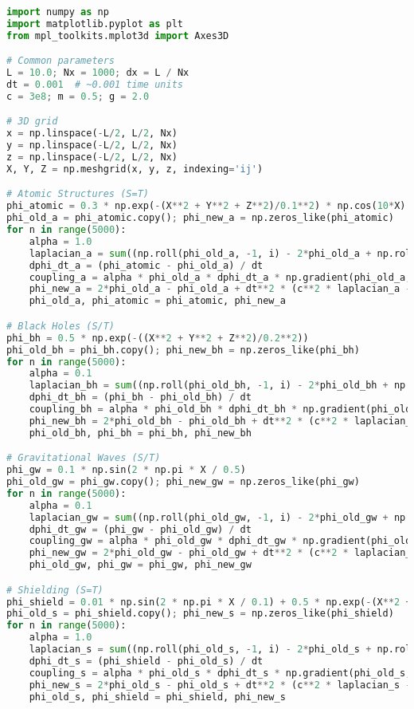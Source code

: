 \documentclass{article}
\begin{document}
\begin{lstlisting}[language=Python, caption=3D Fluxonic Simulations, label=lst:simulation]
import numpy as np
import matplotlib.pyplot as plt
from mpl_toolkits.mplot3d import Axes3D

# Common parameters
L = 10.0; Nx = 1000; dx = L / Nx
dt = 0.001  # ~0.001 time units
c = 3e8; m = 0.5; g = 2.0

# 3D grid
x = np.linspace(-L/2, L/2, Nx)
y = np.linspace(-L/2, L/2, Nx)
z = np.linspace(-L/2, L/2, Nx)
X, Y, Z = np.meshgrid(x, y, z, indexing='ij')

# Atomic Structures (S=T)
phi_atomic = 0.3 * np.exp(-(X**2 + Y**2 + Z**2)/0.1**2) * np.cos(10*X)
phi_old_a = phi_atomic.copy(); phi_new_a = np.zeros_like(phi_atomic)
for n in range(5000):
    alpha = 1.0
    laplacian_a = sum((np.roll(phi_old_a, -1, i) - 2*phi_old_a + np.roll(phi_old_a, 1, i)) / dx**2 for i in range(3))
    dphi_dt_a = (phi_atomic - phi_old_a) / dt
    coupling_a = alpha * phi_old_a * dphi_dt_a * np.gradient(phi_old_a, dx)[0]
    phi_new_a = 2*phi_old_a - phi_old_a + dt**2 * (c**2 * laplacian_a - m**2 * phi_old_a - g * phi_old_a**3 + coupling_a)
    phi_old_a, phi_atomic = phi_atomic, phi_new_a

# Black Holes (S/T)
phi_bh = 0.5 * np.exp(-((X**2 + Y**2 + Z**2)/0.2**2))
phi_old_bh = phi_bh.copy(); phi_new_bh = np.zeros_like(phi_bh)
for n in range(5000):
    alpha = 0.1
    laplacian_bh = sum((np.roll(phi_old_bh, -1, i) - 2*phi_old_bh + np.roll(phi_old_bh, 1, i)) / dx**2 for i in range(3))
    dphi_dt_bh = (phi_bh - phi_old_bh) / dt
    coupling_bh = alpha * phi_old_bh * dphi_dt_bh * np.gradient(phi_old_bh, dx)[0]
    phi_new_bh = 2*phi_old_bh - phi_old_bh + dt**2 * (c**2 * laplacian_bh - m**2 * phi_old_bh - g * phi_old_bh**3 + coupling_bh)
    phi_old_bh, phi_bh = phi_bh, phi_new_bh

# Gravitational Waves (S/T)
phi_gw = 0.1 * np.sin(2 * np.pi * X / 0.5)
phi_old_gw = phi_gw.copy(); phi_new_gw = np.zeros_like(phi_gw)
for n in range(5000):
    alpha = 0.1
    laplacian_gw = sum((np.roll(phi_old_gw, -1, i) - 2*phi_old_gw + np.roll(phi_old_gw, 1, i)) / dx**2 for i in range(3))
    dphi_dt_gw = (phi_gw - phi_old_gw) / dt
    coupling_gw = alpha * phi_old_gw * dphi_dt_gw * np.gradient(phi_old_gw, dx)[0]
    phi_new_gw = 2*phi_old_gw - phi_old_gw + dt**2 * (c**2 * laplacian_gw - m**2 * phi_old_gw - g * phi_old_gw**3 + coupling_gw)
    phi_old_gw, phi_gw = phi_gw, phi_new_gw

# Shielding (S=T)
phi_shield = 0.01 * np.sin(2 * np.pi * X / 0.1) + 0.5 * np.exp(-(X**2 + Y**2 + Z**2)/0.01**2)
phi_old_s = phi_shield.copy(); phi_new_s = np.zeros_like(phi_shield)
for n in range(5000):
    alpha = 1.0
    laplacian_s = sum((np.roll(phi_old_s, -1, i) - 2*phi_old_s + np.roll(phi_old_s, 1, i)) / dx**2 for i in range(3))
    dphi_dt_s = (phi_shield - phi_old_s) / dt
    coupling_s = alpha * phi_old_s * dphi_dt_s * np.gradient(phi_old_s, dx)[0]
    phi_new_s = 2*phi_old_s - phi_old_s + dt**2 * (c**2 * laplacian_s - m**2 * phi_old_s - g * phi_old_s**3 + coupling_s)
    phi_old_s, phi_shield = phi_shield, phi_new_s


\end{lstlisting}
\end{document}
